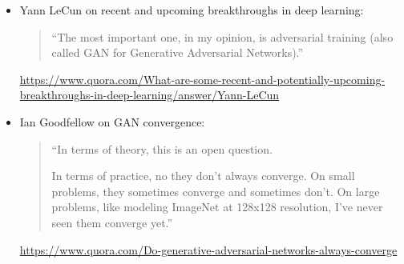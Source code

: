 \documentclass[11pt, a4paper, landscape]{article}
\begin{document}
\NewPage{}
\vfill
\begin{itemize}
	\item Yann LeCun on recent and upcoming breakthroughs in deep learning:
	\begin{quote}
		``The most important one, in my opinion, is adversarial training (also called GAN for Generative Adversarial Networks).''
	\end{quote}
	\url{https://www.quora.com/What-are-some-recent-and-potentially-upcoming-breakthroughs-in-deep-learning/answer/Yann-LeCun}
	\item Ian Goodfellow on GAN convergence:
	\begin{quote}
		``In terms of theory, this is an open question.

		In terms of practice, no they don’t always converge. On small problems, they sometimes converge and sometimes don’t. On large problems, like modeling ImageNet at 128x128 resolution, I’ve never seen them converge yet.''
	\end{quote}
	\url{https://www.quora.com/Do-generative-adversarial-networks-always-converge}
\end{itemize}
	\vfill
\end{document}
